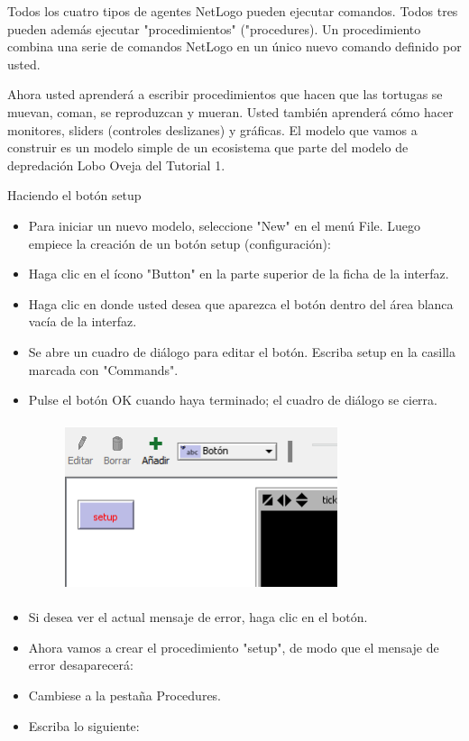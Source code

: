 \documentclass[12pt,letterpaper]{article}
\begin{document}
Todos los cuatro tipos de agentes NetLogo pueden ejecutar comandos. Todos tres pueden además ejecutar "procedimientos" ("procedures). Un procedimiento combina una serie de comandos NetLogo en un único nuevo comando definido por usted.


Ahora usted aprenderá a escribir procedimientos que hacen que las tortugas se muevan, coman, se reproduzcan y mueran.  Usted también aprenderá cómo hacer monitores, sliders (controles deslizanes) y gráficas. El modelo que vamos a construir es un modelo  simple de un ecosistema que parte del modelo de depredación Lobo Oveja del Tutorial 1.

\begin{center}
Haciendo el botón setup
\end{center}

\begin{itemize}

\renewcommand{\labelitemi}{\scriptsize$\blacksquare$}

\item Para iniciar un nuevo modelo, seleccione "New" en el menú File. Luego empiece la creación de un botón setup (configuración):
\item Haga clic en el ícono "Button" en la parte superior de la ficha de la interfaz.
\item Haga clic en donde usted desea que aparezca el botón dentro del área blanca vacía de la interfaz.
\item Se abre un cuadro de diálogo para editar el botón. Escriba setup en la casilla marcada con "Commands".
\item Pulse el botón OK cuando haya terminado; el cuadro de diálogo se cierra.


\begin{figure}
\centering
\includegraphics[width=8cm, height=5cm]{./imagenes/image1.png}
\end{figure}


\item Si desea ver el actual mensaje de error, haga clic en el botón.
\item Ahora vamos a crear el procedimiento "setup", de modo que el mensaje de error desaparecerá:
\item Cambiese a la pestaña Procedures.
\item Escriba lo siguiente:



\end{itemize}
\end{document}
